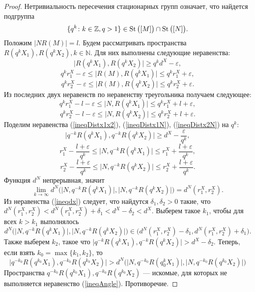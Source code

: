 \begin{proof}
  Нетривиальность пересечения стационарных групп означает, что найдется
  подгруппа \[
    \{q^k \colon k\in \mathbb{Z}, q> 1\} \in \operatorname{St}\big([M]\big) \cap \operatorname{St}
    \big([N]\big).
  \]
  Положим \( |N R(M)| = l \). Будем рассматривать пространства \(
  R(q^k X_1), R(q^k X_2), k \in \mathbb{N} \). Для них выполнены
  следующие неравенства:
  \begin{equation}
    \big| R(q^k X_1), R(q^k X_2) \big| \ge q^k d^X - \varepsilon,
    \label{ineqDistx1x2}
  \end{equation}
  \[
    q^k r_1^X - \varepsilon  \le\big | R(M), R(q^k X_1) \big| \le q^k
    r_1^X + \varepsilon ,
  \]
  \[
    q^k r_2^X - \varepsilon  \le\big | R(M), R(q^k X_2) \big| \le q^k
    r_2^X + \varepsilon .
  \]
  Из последних двух неравенств по неравенству треугольника получаем
  следующее:
  \begin{equation}
    q^k r_1^X - l - \varepsilon \le \big|N, R(q^k X_1) \big| \le
    q^k r_1^X + l + \varepsilon,\label{ineqDistx1N}
  \end{equation}
  \begin{equation}
    q^k r_2^X - l - \varepsilon \le \big|N, R(q^k X_2) \big| \le q^k
    r_2^X + l + \varepsilon.\label{ineqDistx2N}
  \end{equation}
  Поделим неравенства (\ref{ineqDistx1x2}), (\ref{ineqDistx1N}),
  (\ref{ineqDistx2N}) на \( q^k \):
  \[ \big| q^{-k}R(q^k X_1), q^{-k}R(q^k X_2) \big| \ge d^X -
  \frac{\varepsilon }{q^k}, \]
  \[
    r_1^X - \frac{l + \varepsilon}{q^k} \le \big|N, q^{-k}R(q^k X_1)
    \big| \le
    r_1^X + \frac{l + \varepsilon}{q^k},
  \]
  \[
    r_2^X - \frac{l + \varepsilon}{q^k} \le \big|N, q^{-k}R(q^k X_2)
    \big| \le
    r_2^X + \frac{l + \varepsilon}{q^k}.
  \]
  Функция \( d^N \) непрерывная, значит
  \[
    \lim_{k \rightarrow \infty
    }d^N\Big(\big|N, q^{-k}R(q^k X_1)
      \big|, \big|N, q^{-k}R(q^k X_2)
    \big|\Big) = d^N(r_1^X, r_2^X).
  \]
  Из неравенства (\ref{ineqdx}) следует, что найдутся \( \delta
    _1, \delta _2
  > 0 \) такие, что \( d^N(r_1^X,r_2^X)<d^N(r_1^X, r_2^X)+\delta
  _1 < d^X- \delta _2 < d^X \). Выберем такое \( k_1 \), чтобы
  для всех \( k > k_1 \) выполнялось
  \[
    d^N\Big(\big|N, q^{-k}R(q^k X_1)
      \big|, \big|N, q^{-k}R(q^k X_2)
    \big|\Big) \in \big(d^N(r_1^X, r_2^X)- \delta _1,
  d^N(r_1^X, r_2^X)+ \delta _1\big).  \]
  Также выберем \( k_2 \), такое что \( \big| q^{-k}R(q^k X_1),
  q^{-k}R(q^k X_2) \big| > d^X - \delta _2 \).
  Теперь, если взять \( k_0 = \max\{k_1,k_2\} \), то
  \[ \big| q^{-k_0}R(q^{k_0} X_1), q^{-k_0}R(q^{k_0} X_2) \big|
    > d^N\Big(\big|N, q^{-k_0}R(q^k_0 X_1) \big|, \big|N,
  q^{-k_0}R(q^{k_0} X_2) \big|\Big) \]
  Пространства \( q^{-k_0}R(q^{k_0}X_1), q^{-k_0}R(q^{k_0}X_2)\)
  ---
  искомые, для которых не выполняется неравенство (\ref{ineqAngle}).
  Противоречие.
\end{proof}

